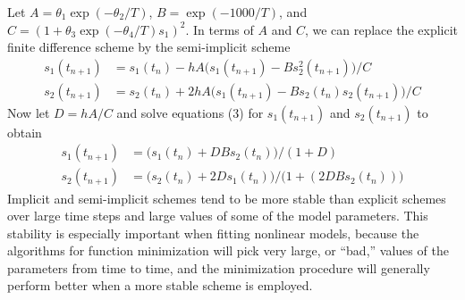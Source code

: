 \documentclass{admbmanual}
\begin{document}
Let $A=\theta_1\exp(-\theta_2/T)$, $B=\exp(-1000/T)$, and  
$C=(1+\theta_3\exp(-\theta_4/T)s_1)^2$.
In terms of $A$ and $C$, we can replace the explicit finite difference 
scheme by the semi-implicit scheme
\begin{align}
   \nonumber   s_1(t_{n+1}) &=    s_1(t_n)-hA\big(s_1(t_{n+1})-B  s_2^2(t_{n+1})\big)/C \\[6pt]
                       s_2(t_{n+1}) &=   s_2(t_n)+2hA\big(s_1(t_{n+1})-Bs_2(t_n) s_2(t_{n+1})\big)/C
\end{align}
Now let $D=hA/C$ and solve equations (3) for 
$s_1(t_{n+1})$ and $s_2(t_{n+1})$ to obtain
\begin{align}
  \nonumber  s_1(t_{n+1})&= \big(s_1(t_n)+DB s_2(t_n)\big)/(1+D) \\[6pt]
                     s_2(t_{n+1})&= \big(s_2(t_n)+2Ds_1(t_n)\big)/  \big(1+(2DBs_2(t_n))\big)
\end{align}
Implicit and semi-implicit schemes tend to be more stable than
explicit schemes over large time steps and large values of some of the
model parameters. This stability is especially important when
fitting nonlinear models, because the algorithms for function
minimization will pick very large, or ``bad,'' values of the
parameters from time to time, and the minimization procedure will
generally perform better when a more stable scheme is employed.
\end{document}
